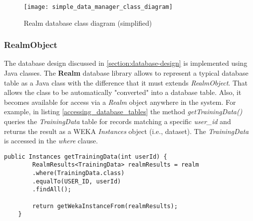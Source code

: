     \begin{figure}[ht]
    \centering
    \texttt{[image: simple\_data\_manager\_class\_diagram]}
    \caption{Realm database class diagram (simplified)}
    \label{fig:realm_database}
    \end{figure}
    
    \subsubsection{RealmObject}
     The database design discussed in \ref{section:database-design} is implemented using Java classes. The \textbf{Realm} database library allows to represent a typical database table as a Java class with the difference that it must extends \textit{RealmObject}. That allows the class to be automatically "converted" into a database table. Also, it becomes available for access via a \textit{Realm} object anywhere in the system. For example, in listing \ref{accessing_database_tables} the method \textit{getTrainingData()} queries the \textit{TrainingData} table for records matching a specific \textit{user\_id} and returns the result as a WEKA \textit{Instances} object (i.e., dataset). The \textit{TrainingData} is accessed in the \textit{where} clause.
     
     \begin{lstlisting}[caption= Accessing database tables, label=accessing_database_tables,
     frame=tlrbr,basicstyle=\small,captionpos=b]
   public Instances getTrainingData(int userId) {
        RealmResults<TrainingData> realmResults = realm
        .where(TrainingData.class)
        .equalTo(USER_ID, userId)
        .findAll();
        
        return getWekaInstanceFrom(realmResults);
    }
    \end{lstlisting}
    
